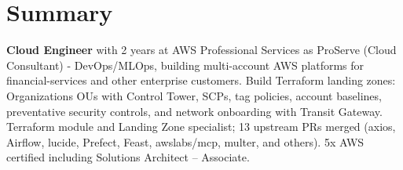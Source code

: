 \section{\textbf{Summary}}
\vspace{1pt}
\small{\textbf{Cloud Engineer} with 2 years at AWS Professional Services as ProServe (Cloud Consultant) - DevOps/MLOps, building multi-account AWS platforms for financial-services and other enterprise customers. Build Terraform landing zones: Organizations OUs with Control Tower, SCPs, tag policies, account baselines, preventative security controls, and network onboarding with Transit Gateway. Terraform module and Landing Zone specialist; 13 upstream PRs merged (axios, Airflow, lucide, Prefect, Feast, awslabs/mcp, multer, and others). 5x AWS certified including Solutions Architect -- Associate.}
\vspace{-2mm}
